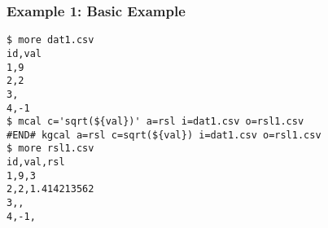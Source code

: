 \subsubsection*{Example 1: Basic Example}



\begin{Verbatim}[baselinestretch=0.7,frame=single]
$ more dat1.csv
id,val
1,9
2,2
3,
4,-1
$ mcal c='sqrt(${val})' a=rsl i=dat1.csv o=rsl1.csv
#END# kgcal a=rsl c=sqrt(${val}) i=dat1.csv o=rsl1.csv
$ more rsl1.csv
id,val,rsl
1,9,3
2,2,1.414213562
3,,
4,-1,
\end{Verbatim}
